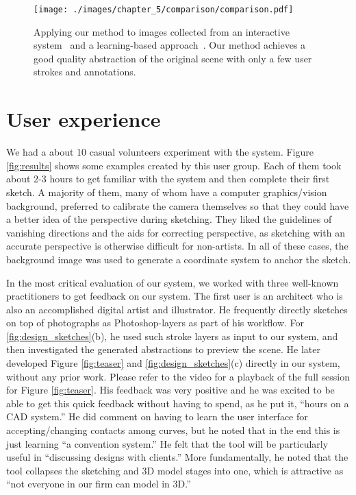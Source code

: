 \begin{figure}
  \texttt{[image: ./images/chapter\_5/comparison/comparison.pdf]}
  \caption[Comparison to existed work.]{Applying our method to images collected from an interactive system~\protect\cite{Sinha:2008:IAM} and a learning-based approach~\protect\cite{SaxenaSN09}. Our method achieves a good quality abstraction of the original scene with only a few user strokes and annotations.
  \label{fig:comparison}
  }
\end{figure}



\section{User experience}

We had a about 10 casual volunteers experiment with the system. Figure \ref{fig:results} shows some examples created by this user group. Each of them took about 2-3 hours to get familiar with the system and then complete their first sketch. A majority of them, many of whom have a computer graphics/vision background, preferred to calibrate the camera themselves so that they could have a better idea of the perspective during sketching. They liked the guidelines of vanishing directions and the aids for correcting perspective, as sketching with an accurate perspective is otherwise difficult for non-artists.
%
In all of these cases, the background image was used to generate a coordinate system to anchor the sketch.

In the most critical evaluation of our system, we worked with three well-known practitioners to get feedback on our system.
%
%
The first user is an architect who is also an accomplished digital artist and illustrator. He frequently directly sketches on top of photographs as Photoshop-layers as part of his workflow. %
%
For \ref{fig:design_sketches}(b), he used such stroke layers as input to our system, and then investigated the generated abstractions to preview the scene.
%
He later developed Figure \ref{fig:teaser} and \ref{fig:design_sketches}(c) directly in our system, without any prior work. Please refer to the video for a playback of the full session for Figure \ref{fig:teaser}.
%
His feedback was very positive and he was excited to be able to get this quick feedback without having to spend, as he put it, ``hours on a CAD system.''  He did comment on having to learn the user interface for accepting/changing contacts among curves, but he noted that in the end this is just learning ``a convention system.''
%
He felt that the tool will be particularly useful in ``discussing designs with clients.''  More fundamentally, he noted that the tool collapses the sketching and 3D model stages into one, which is attractive as ``not everyone in our firm can model in 3D.''
%

